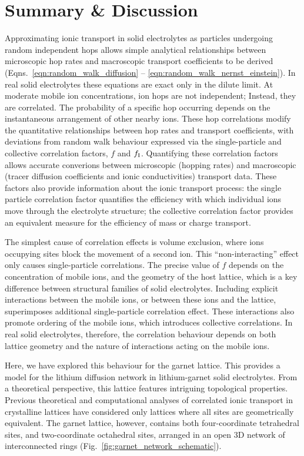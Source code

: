 \documentclass[aps,prb,twocolumn,superscriptaddress,reprint]{revtex4-1}
\begin{document}
\section{Summary \& Discussion}

Approximating ionic transport in solid electrolytes as particles undergoing random independent hops allows simple analytical relationships between microscopic hop rates and macroscopic transport coefficients to be derived (Eqns.~\ref{eqn:random_walk_diffusion} -- \ref{eqn:random_walk_nernst_einstein}). In real solid electrolytes these equations are exact only in the dilute limit. At moderate mobile ion concentrations, ion hops are not independent; 
Instead, they are correlated. The probability of a specific hop occurring depends on the instantaneous arrangement of other nearby ions. These hop correlations modify the quantitative relationships between hop rates and transport coefficients, with deviations from random walk behaviour expressed via the single-particle and collective correlation factors, $f$ and $f_{\mathrm{I}}$. Quantifying these correlation factors allows accurate converions between microscopic (hopping rates) and macroscopic (tracer diffusion coefficients and ionic conductivities) transport data. These factors also provide information about the ionic transport process: the single particle correlation factor quantifies the efficiency with which individual ions move through the electrolyte structure; the collective correlation factor provides an equivalent measure for the efficiency of mass or charge transport.

The simplest cause of correlation effects is volume exclusion, where ions occupying sites block the movement of a second ion. This ``non-interacting'' effect only causes single-particle correlations. The precise value of $f$ depends on the concentration of mobile ions, and the geometry of the host lattice, which is a key difference between structural families of solid electrolytes. Including explicit interactions between the mobile ions, or between these ions and the lattice, superimposes additional single-particle correlation effect. These interactions also promote ordering of the mobile ions, which introduces collective correlations. In real solid electrolytes, therefore, the correlation behaviour depends on both lattice geometry and the nature of interactions acting on the mobile ions.

Here, we have explored this behaviour for the garnet lattice. This provides a model for the lithium diffusion network in lithium-garnet solid electrolytes. From a theoretical perspective, this lattice features intriguing topological properties. Previous theoretical and computational analyses of correlated ionic transport in crystalline lattices have considered only lattices where all sites are geometrically equivalent. The garnet lattice, however, contains both four-coordinate tetrahedral sites, and two-coordinate octahedral sites, arranged in an open 3D network of interconnected rings (Fig.~\ref{fig:garnet_network_schematic}). 
\end{document}
